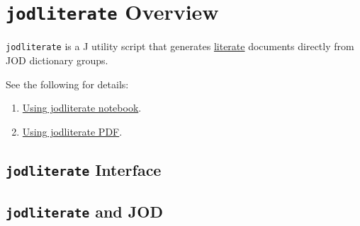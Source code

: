 \section{\texttt{jodliterate} Overview}


\texttt{jodliterate} is a J utility script that generates
\href{https://en.wikipedia.org/wiki/Literate_programming}{literate} documents directly from JOD dictionary groups.

See the following for details:
\begin{enumerate}
\item
 \href{https://github.com/bakerjd99/jacks/blob/master/jodliterate/Using%20jodliterate.ipynb}{Using jodliterate notebook}.
\item
 \href{https://github.com/bakerjd99/jacks/blob/master/jodliterate/UsingJodliterate.pdf}{Using jodliterate PDF}.
\end{enumerate}

\subsection{\texttt{jodliterate} Interface}

\begin{Shaded}
\begin{Highlighting}[]
\hyperlink{THISPANDOC}{}
\hyperlink{formifacetex}{}
\hyperlink{grplit}{}
\hyperlink{ifacesection}{}
\hyperlink{ifc}{}
\hyperlink{setjodliterate}{}
\hyperlink{wordlit}{}
\end{Highlighting}
\end{Shaded}

\subsection{\texttt{jodliterate} and JOD}

